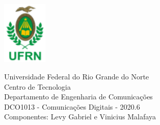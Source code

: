 \documentclass[12pt]{article}
\newcommand{\hoofding}[6]{ 
\begin{flushleft}
\includegraphics[height=3cm]{images/ufrn.png} 
\end{flushleft}
\vspace{-3.3cm} 
\hspace{3cm} 
\parbox{10cm}{#1\\#2\\#3\\#4\\#5\\#6} 
\vspace{-0.6cm}
\hspace{1cm}   

{\parindent=0pt \hrulefill} 
\vspace{0mm}}
\begin{document}
\hoofding {Universidade Federal do Rio Grande do Norte}{Centro de Tecnologia}{Departamento de Engenharia de Comunicações}{DCO1013 - Comunicações Digitais - 2020.6}{Componentes: Levy Gabriel e Vinicius Malafaya}

\onehalfspacing 


\end{document}
